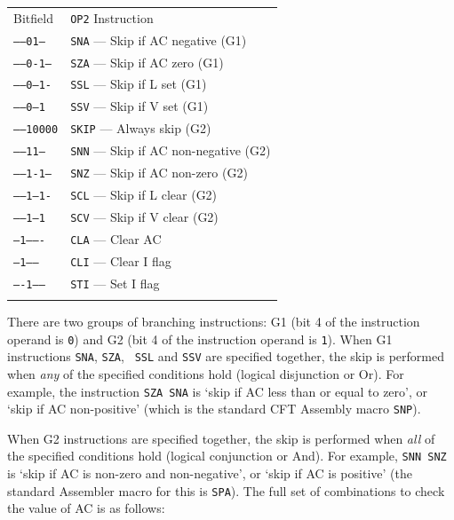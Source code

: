 \documentclass[11pt,a4paper,twocolumns]{article}
\newcommand\register[1]{\textsf{#1}}
\newcommand\A{\register{AC}}
\newcommand\Areg{\A}
\newcommand\Lreg{\register{L}}
\newcommand\Ireg{\register{I}}
\newcommand\Vreg{\register{V}}
\begin{document}
\vspace{1em}\noindent\begin{center}
\begin{tabular}{ll}
  Bitfield & {\tt OP2} Instruction \\\noalign{\smallskip}\hline\noalign{\smallskip}
  {\tt -----01---} & {\tt SNA} — Skip if \A{} negative (G1)\\
  {\tt -----0-1--} & {\tt SZA} — Skip if \A{} zero (G1) \\
  {\tt -----0--1-} & {\tt SSL} — Skip if \Lreg{} set (G1) \\
  {\tt -----0---1} & {\tt SSV} — Skip if \Vreg{} set (G1) \\
  {\tt -----10000} & {\tt SKIP} — Always skip (G2) \\
  {\tt -----11---} & {\tt SNN} — Skip if \A{} non-negative (G2) \\
  {\tt -----1-1--} & {\tt SNZ} — Skip if \A{} non-zero (G2) \\
  {\tt -----1--1-} & {\tt SCL} — Skip if \Lreg{} clear (G2) \\
  {\tt -----1---1} & {\tt SCV} — Skip if \Vreg{} clear (G2) \\
  {\tt --1-------} & {\tt CLA} — Clear \A{} \\
  {\tt ---1------} & {\tt CLI} — Clear \Ireg{} flag \\
  {\tt ----1-----} & {\tt STI} — Set \Ireg{} flag \\%
  \noalign{\smallskip}\hline\noalign{\smallskip}
\end{tabular}
\end{center}\vspace{1em}

There are two groups of branching instructions: G1 (bit 4 of the
instruction operand is {\tt 0}) and G2 (bit 4 of the instruction
operand is {\tt 1}). When G1 instructions {\tt SNA}, {\tt SZA}, {\tt
  SSL} and {\tt SSV} are specified together, the skip is performed
when {\em any\/} of the specified conditions hold (logical disjunction
or Or). For example, the instruction {\tt SZA SNA} is ‘skip if \A{} less
than or equal to zero’, or ‘skip if \A{} non-positive’ (which is the
standard CFT Assembly macro {\tt SNP}).

When G2 instructions are specified together, the skip is performed
when {\em all\/} of the specified conditions hold (logical conjunction
or And). For example, {\tt SNN SNZ} is ‘skip if \A{} is non-zero and
non-negative’, or ‘skip if \A{} is positive’ (the standard Assembler
macro for this is {\tt SPA}). The full set of combinations to check
the value of \Areg{} is as follows:
\end{document}

